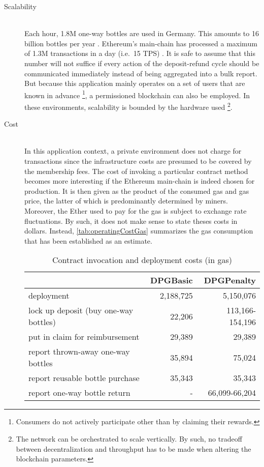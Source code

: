 \begin{description}
	\item[Scalability]
	\hfill \\
	Each hour, 1.8M one-way bottles are used in Germany. This amounts to 16 billion bottles per year \cite{DUHEinweg}. Ethereum's main-chain has processed a maximum of 1.3M transactions in a day (i.e.~15 TPS) \cite{etherscan}. It is safe to assume that this number will not suffice if every action of the deposit-refund cycle should be communicated immediately instead of being aggregated into a bulk report. But because this application mainly operates on a set of users that are known in advance \footnote{Consumers do not actively participate other than by claiming their rewards.}, a permissioned blockchain can also be employed. In these environments, scalability is bounded by the hardware used \footnote{The network can be orchestrated to scale vertically. By such, no tradeoff between decentralization and throughput has to be made when altering the blockchain parameters.}. 
	
	\item[Cost]
	\hfill \\
	In this application context, a private environment does not charge for transactions since the infrastructure costs are presumed to be covered by the membership fees. The cost of invoking a particular contract method becomes more interesting if the Ethereum main-chain is indeed chosen for production. It is then given as the product of the consumed gas and gas price, the latter of which is predominantly determined by miners. Moreover, the Ether used to pay for the gas is subject to exchange rate fluctuations. By such, it does not make sense to state theses costs in dollars. Instead, \autoref{tab:operatingCostGas} summarizes the gas consumption that has been established as an estimate.

	\begin{table}[hbt]
	\centering	
	\begin{tabular}{l|r|r}
    	& DPGBasic & DPGPenalty \\
    	\hline
    	deployment & 2,188,725 & 5,150,076 \\
    	\hline
    	lock up deposit (buy one-way bottles) & 22,206 & 113,166-154,196 \\ 
    	put in claim for reimbursement & 29,389 & 29,389 \\
    	report thrown-away one-way bottles & 35,894 & 75,024 \\
    	report reusable bottle purchase & 35,343 & 35,343 \\
    	\hline
    	report one-way bottle return & - & 66,099-66,204 \\
	\end{tabular}
	\caption[Contract invocation and deployment costs (in gas)]{Contract invocation and deployment costs (in gas) \footnotemark}
	\label{tab:operatingCostGas}
	\end{table}
	
	\FloatBarrier

\end{description}
  
